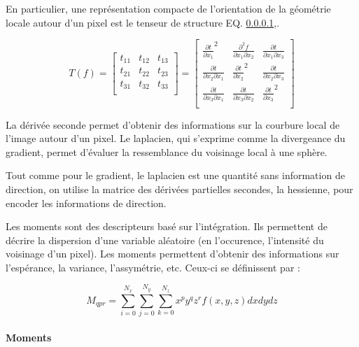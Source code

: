 En particulier, une représentation compacte de l'orientation de la géométrie locale autour d'un pixel est le tenseur de structure EQ. \ref{},.

\begin{equation}
T(f) =
\begin{bmatrix}
t_{11} & t_{12} & t_{13} \\
t_{21} & t_{22} & t_{23} \\
t_{31} & t_{32} & t_{33} \\
\end{bmatrix}
  =
\begin{bmatrix}
{\frac{\partial t}{\partial x_1}}^2 & \frac{\partial^2 f}{\partial x_1 \partial x_2} & \frac{\partial t}{\partial x_1 \partial x_3} \\
\frac{\partial t}{\partial x_2 \partial x_1} & {\frac{\partial t}{\partial x_2}}^2 & \frac{\partial t}{\partial x_2 \partial x_3} \\
\frac{\partial t}{\partial x_3 \partial x_1} & \frac{\partial t}{\partial x_3 \partial x_2} & {\frac{\partial t}{\partial x_3}}^2 \\
\end{bmatrix}
\nonumber
\end{equation}

La dérivée seconde permet d'obtenir des informations sur la courbure local de l'image autour d'un pixel. Le laplacien, qui s'exprime comme la divergeance du gradient, permet d'évaluer la ressemblance du voisinage local à une sphère. \cite{Wang2020_tensor_cut}

Tout comme pour le gradient, le laplacien est une quantité sans information de direction, on utilise la matrice des dérivées partielles secondes, la hessienne, pour encoder les informations de direction.

Les moments sont des descripteurs basé sur l'intégration. Ils permettent de décrire la dispersion d'une variable aléatoire (en l'occurence, l'intensité du voisinage d'un pixel). Les moments permettent d'obtenir des informations sur l'espérance, la variance, l'assymétrie, etc. Ceux-ci se définissent par :

\begin{equation}
  M_{qpr}= \sum_{i=0}^{N_x}\sum_{j=0}^{N_y}\sum_{k=0}^{N_z}x^py^qz^r f(x,y,z) dxdydz
\end{equation}

\paragraph{Moments}

